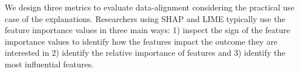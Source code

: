 \documentclass[mnsc,blindrev]{informs3}
\begin{document}
         
          We design three metrics to evaluate data-alignment  considering the practical use case of the explanations. Researchers using SHAP and LIME typically use the feature importance values in three main ways: 1) inspect the sign of the feature importance values to identify how the features impact the outcome they are interested in %
         2)  identify the relative importance of features %
         and 3) identify the most influential features. %
\end{document}
